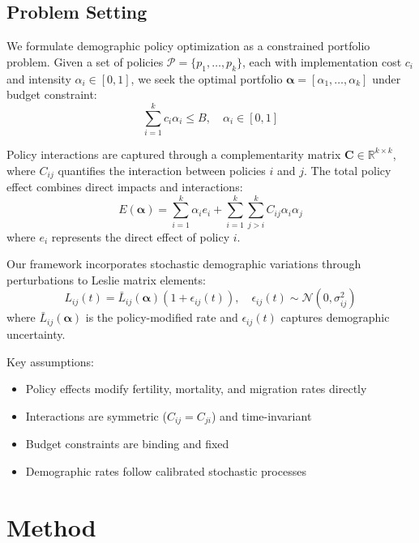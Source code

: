 \documentclass{article} %
\begin{document}
\subsection{Problem Setting}
\label{subsec:problem}

We formulate demographic policy optimization as a constrained portfolio problem. Given a set of policies $\mathcal{P} = \{p_1, \ldots, p_k\}$, each with implementation cost $c_i$ and intensity $\alpha_i \in [0,1]$, we seek the optimal portfolio $\boldsymbol{\alpha} = [\alpha_1, \ldots, \alpha_k]$ under budget constraint:
\begin{equation}
    \sum_{i=1}^k c_i\alpha_i \leq B, \quad \alpha_i \in [0,1]
\end{equation}

Policy interactions are captured through a complementarity matrix $\mathbf{C} \in \mathbb{R}^{k \times k}$, where $C_{ij}$ quantifies the interaction between policies $i$ and $j$. The total policy effect combines direct impacts and interactions:
\begin{equation}
    E(\boldsymbol{\alpha}) = \sum_{i=1}^k \alpha_i e_i + \sum_{i=1}^k \sum_{j>i}^k C_{ij}\alpha_i\alpha_j
\end{equation}
where $e_i$ represents the direct effect of policy $i$.

Our framework incorporates stochastic demographic variations through perturbations to Leslie matrix elements:
\begin{equation}
    L_{ij}(t) = \bar{L}_{ij}(\boldsymbol{\alpha})(1 + \epsilon_{ij}(t)), \quad \epsilon_{ij}(t) \sim \mathcal{N}(0, \sigma_{ij}^2)
\end{equation}
where $\bar{L}_{ij}(\boldsymbol{\alpha})$ is the policy-modified rate and $\epsilon_{ij}(t)$ captures demographic uncertainty.

Key assumptions:
\begin{itemize}
    \item Policy effects modify fertility, mortality, and migration rates directly
    \item Interactions are symmetric ($C_{ij} = C_{ji}$) and time-invariant
    \item Budget constraints are binding and fixed
    \item Demographic rates follow calibrated stochastic processes
\end{itemize}

\section{Method}
\label{sec:method}
\end{document}
